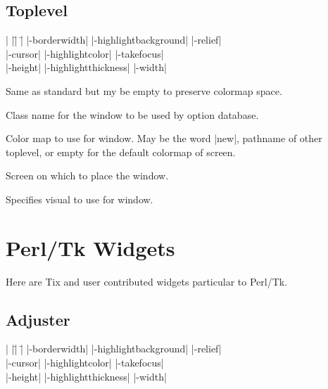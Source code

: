 \subsection*{Toplevel}
\vspace{-4pt}

\begin{tabbing}
|                   |\=|                     |\= \kill
|-borderwidth| \> |-highlightbackground|     \> |-relief| \\   
|-cursor|      \> |-highlightcolor|          \> |-takefocus| \\
|-height|      \> |-highlightthickness|      \> |-width| \\
\end{tabbing}

\vskip5pt
\begin{enum}{1cm}

Same as standard but my be empty to preserve colormap space.

Class name for the window to be used by option database.

Color map to use for window. May be the word |new|, pathname of
other toplevel, or empty for the default colormap of screen.

Screen on which to place the window.
 
Specifies visual to use for window.

\end{enum}


\section{Perl/Tk Widgets}

Here are Tix and user contributed widgets particular to Perl/Tk.

\subsection*{Adjuster}
\vspace{-4pt}

\begin{tabbing}
|                   |\=|                     |\= \kill
|-borderwidth|      \> |-highlightbackground| \> |-relief| \\
|-cursor|           \> |-highlightcolor|      \> |-takefocus| \\
|-height|	    \> |-highlightthickness|  \> |-width| \\
\end{tabbing}

